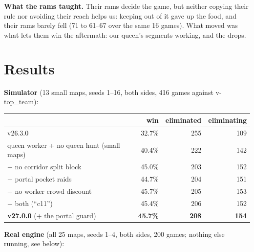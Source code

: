 \documentclass[11pt,a4paper]{article}
\begin{document}
\textbf{What the rams taught.} Their rams decide the game, but neither copying their rule nor avoiding their reach helps us:
keeping out of it gave up the food, and their rams barely fell (71 to 61--67 over the same 16 games). What moved was what lets them win the aftermath:
our queen's segments working, and the drops.

\section{Results}\label{sec:v27results}
\textbf{Simulator} (13 small maps, seeds 1--16, both sides, 416 games against v-top\_team):
\begin{center}
\begin{tabular}{lrrr}
  & win & eliminated & eliminating \\ \hline
  v26.3.0 & 32.7\% & 255 & 109 \\
  queen worker + no queen hunt (small maps) & 40.4\% & 222 & 142 \\
  \quad + no corridor split block & 45.0\% & 203 & 152 \\
  \quad + portal pocket raids & 44.7\% & 204 & 151 \\
  \quad + no worker crowd discount & 45.7\% & 205 & 153 \\
  \quad + both (``c11'') & 45.4\% & 206 & 152 \\
  \textbf{v27.0.0} (+ the portal guard) & \textbf{45.7\%} & \textbf{208} & \textbf{154} \\
\end{tabular}
\end{center}
\textbf{Real engine} (all 25 maps, seeds 1--4, both sides, 200 games; nothing else running, see below):
\end{document}
